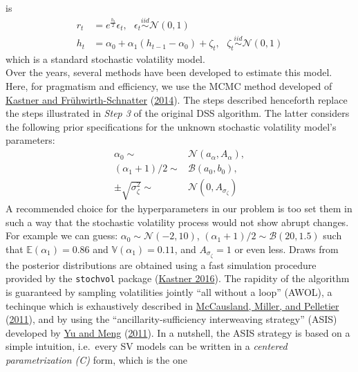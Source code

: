\documentclass[
  12pt,
]{book}
\theoremstyle{break}
\theoremstyle{nonumberplain}
\begin{document}
is \begin{equation}
   \begin{aligned}\label{eq:centeredpar}
r_{t} & =e^{\frac{h_{t}}{2}}\epsilon_{t}, \ \ \ \epsilon_{t}\overset{iid}{\sim}\mathcal{N}(0,1) \\
h_{t} & =\alpha_{0}+\alpha_{1}(h_{t-1}-\alpha_0)+\zeta_{t}, \ \ \ \zeta_{t}\overset{iid}{\sim}\mathcal{N}(0,1)
\end{aligned}
\end{equation} which is a standard stochastic volatility model.\\
Over the years, several methods have been developed to estimate this
model. Here, for pragmatism and efficiency, we use the MCMC method
developed of \protect\hyperlink{ref-KASTNER2014408}{Kastner and
Frühwirth-Schnatter} (\protect\hyperlink{ref-KASTNER2014408}{2014}). The
steps described henceforth replace the steps illustrated in
\emph{Step 3} of the original DSS algorithm. The latter considers the
following prior specifications for the unknown stochastic volatility
model's parameters: \begin{align*}
\alpha_{0}\sim & \mathcal{N}(a_{\alpha},A_{\alpha}),\\
(\alpha_{1}+1)/2\sim & \mathcal{B}(a_{0},b_{0}),\\
\pm\sqrt{\sigma^{2}_{\zeta}}\sim & \mathcal{N}(0,A_{\sigma_{\zeta}})
\end{align*} A recommended choice for the hyperparameters in our problem
is too set them in such a way that the stochastic volatility process
would not show abrupt changes. For example we can guess:
\(\alpha_{0}\sim \mathcal{N}(-2,10)\),
\((\alpha_{1}+1)/2\sim \mathcal{B}(20,1.5)\) such that
\(\mathbb E(\alpha_1)=0.86\) and \(\mathbb V(\alpha_1)=0.11\), and
\(A_{\sigma_{\zeta}}=1\) or even less. Draws from the posterior
distributions are obtained using a fast simulation procedure provided by
the \texttt{stochvol} package (\protect\hyperlink{ref-SV_2016}{Kastner
2016}). The rapidity of the algorithm is guaranteed by sampling
volatilities jointly ``all without a loop'' (AWOL), a techinque which is
exhaustively described in
\protect\hyperlink{ref-MCCAUSLAND2011199}{McCausland, Miller, and
Pelletier} (\protect\hyperlink{ref-MCCAUSLAND2011199}{2011}), and by
using the ``ancillarity-sufficiency interweaving strategy'' (ASIS)
developed by \protect\hyperlink{ref-YM_2011}{Yu and Meng}
(\protect\hyperlink{ref-YM_2011}{2011}). In a nutshell, the ASIS
strategy is based on a simple intuition, i.e.~every SV models can be
written in a \emph{centered parametrization (C)} form, which is the one
\end{document}
